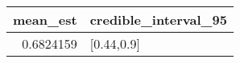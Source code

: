 \begin{longtable}{rl}
\toprule
mean\_est & credible\_interval\_95 \\ 
\midrule
0.6824159 & [0.44,0.9] \\ 
\bottomrule
\end{longtable}

